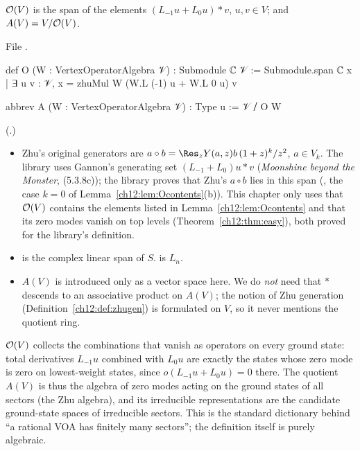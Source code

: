 \begin{definition}\label{ch12:def:O}
$\mathcal{O}(V)$ is the span of the elements $(L_{-1}u+L_0u)\ast v$, $u,v\in V$; and
$A(V)=V/\mathcal{O}(V)$.
\end{definition}
File .
\begin{leancode}
def O (W : VertexOperatorAlgebra 𝒱) : Submodule ℂ 𝒱 :=
  Submodule.span ℂ {x | ∃ u v : 𝒱, x = zhuMul W (W.L (-1) u + W.L 0 u) v}

abbrev A (W : VertexOperatorAlgebra 𝒱) : Type u := 𝒱 ⧸ O W
\end{leancode}
(.)
\begin{dictionary}
\begin{itemize}
\item Zhu's original generators are $a\circ b=\Res_zY(a,z)b\,(1+z)^k/z^2$, $a\in V_k$.  The library uses
  Gannon's generating set $(L_{-1}+L_0)u\ast v$ (\emph{Moonshine beyond the Monster}, (5.3.8c)); the
  library proves that Zhu's $a\circ b$ lies in this span (, the case $k=0$ of
  Lemma~\ref{ch12:lem:Ocontents}(b)).  This chapter only uses that $\mathcal{O}(V)$ contains the
  elements listed in Lemma~\ref{ch12:lem:Ocontents} and that its zero modes vanish on top levels
  (Theorem~\ref{ch12:thm:easy}), both proved for the library's definition.
\item {} is the complex linear span of $S$.   is $L_n$.
\item $A(V)$ is introduced only as a vector space here.  We do \emph{not} need that $\ast$ descends to
  an associative product on $A(V)$; the notion of Zhu generation (Definition~\ref{ch12:def:zhugen}) is
  formulated on $V$, so it never mentions the quotient ring.
\end{itemize}
\end{dictionary}

\begin{physics}
$\mathcal{O}(V)$ collects the combinations that vanish as operators on every ground state: total derivatives $L_{-1}u$ combined with $L_0u$ are exactly the states whose zero mode is zero on lowest-weight states, since $o(L_{-1}u+L_0u)=0$ there. The quotient $A(V)$ is thus the algebra of zero modes acting on the ground states of all sectors (the Zhu algebra), and its irreducible representations are the candidate ground-state spaces of irreducible sectors. This is the standard dictionary behind ``a rational VOA has finitely many sectors''; the definition itself is purely algebraic.
\end{physics}

